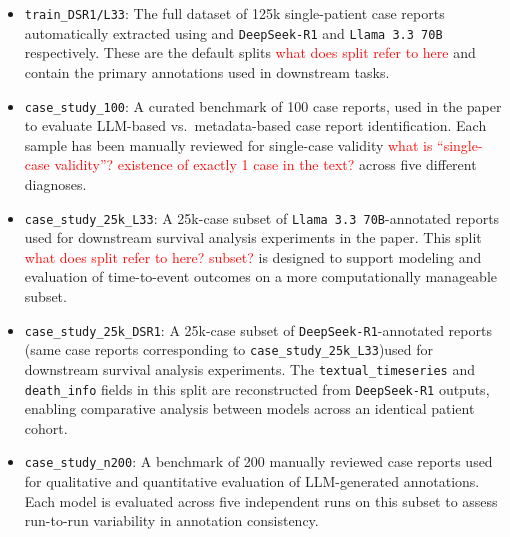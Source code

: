\documentclass[pdflatex,sn-mathphys-num]{sn-jnl}%
\newcommand{\jeremy}[1]{\textcolor{red}{#1}}
\theoremstyle{thmstyleone}%
\theoremstyle{thmstyletwo}%
\theoremstyle{thmstylethree}%
\begin{document}
\begin{itemize}
    \item \texttt{train\_DSR1/L33}: The full dataset of 125k single-patient case reports automatically extracted using and \texttt{DeepSeek-R1} and \texttt{Llama 3.3 70B} respectively. These are the default splits \jeremy{what does split refer to here} and contain the primary annotations used in downstream tasks.
    
    \item \texttt{case\_study\_100}: A curated benchmark of 100 case reports, used in the paper to evaluate LLM-based vs.\ metadata-based case report identification. Each sample has been manually reviewed for single-case validity \jeremy{what is ``single-case validity''? existence of exactly 1 case in the text?} across five different diagnoses.
    
    \item \texttt{case\_study\_25k\_L33}: A 25k-case subset of \texttt{Llama 3.3 70B}-annotated reports used for downstream survival analysis experiments in the paper. This split \jeremy{what does split refer to here? subset?} is designed to support modeling and evaluation of time-to-event outcomes on a more computationally manageable subset.
    
    \item \texttt{case\_study\_25k\_DSR1}: A 25k-case subset of \texttt{DeepSeek-R1}-annotated reports (same case reports corresponding to \texttt{case\_study\_25k\_L33})used for downstream survival analysis experiments. The \texttt{textual\_timeseries} and \texttt{death\_info} fields in this split are reconstructed from \texttt{DeepSeek-R1} outputs, enabling comparative analysis between models across an identical patient cohort.
    
    \item \texttt{case\_study\_n200}: A benchmark of 200 manually reviewed case reports used for qualitative and quantitative evaluation of LLM-generated annotations. Each model is evaluated across five independent runs on this subset to assess run-to-run variability in annotation consistency.

\end{itemize}
\end{document}
